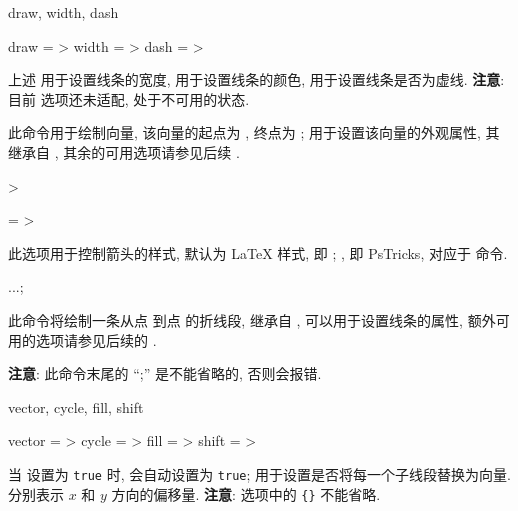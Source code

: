 \documentclass[
  hyper, lang=cn, 
  class=l3dox, 
]{../../zlatex/code/ztex}
\begin{document}
\begin{keyval}[parent=ztool/../line]{draw, width, dash}
  \begin{syntax}
    draw  = >
    width = >\dval{.4pt}
    dash  = >
  \end{syntax}
  上述  用于设置线条的宽度,  用于设置线条的颜色,  用于设置线条是否为虚线.
  \textbf{注意}: 目前  选项还未适配, 处于不可用的状态.
\end{keyval}


\begin{function}[added=2025-05-13]{\zvector}
  \begin{syntax}
     
  \end{syntax}
  此命令用于绘制向量, 该向量的起点为 , 终点为 ;
   用于设置该向量的外观属性, 其继承自 , 
  其余的可用选项请参见后续 .  
\end{function}


\begin{keyval}[parent=ztool/../vector]{>}
  \begin{syntax}
    \texttt{} = >
  \end{syntax}
  此选项用于控制箭头的样式, 默认为 \LaTeX{} 样式, 即 ; 
  , 即 PsTricks, 对应于  命令.
\end{keyval}



\begin{function}[added=2025-05-13]{\zdraw}
  \begin{syntax}
     ...;
  \end{syntax}
  此命令将绘制一条从点  到点  的折线段,  继承自 , 
  可以用于设置线条的属性, 额外可用的选项请参见后续的 .\par 
  \textbf{注意}: 此命令末尾的 ``;'' 是不能省略的, 否则会报错. 
\end{function}


\begin{keyval}[parent=ztool/../zdraw]{vector, cycle, fill, shift}
  \begin{syntax}
    vector = >
    cycle  = >
    fill   = >
    shift  = >
  \end{syntax}
  当  设置为 \texttt{true} 时,  会自动设置为 \texttt{true}; 
   用于设置是否将每一个子线段替换为向量.  分别表示 $x$ 和 $y$ 方向的偏移量. 
  \textbf{注意}:  选项中的 \texttt{\{\}} 不能省略.
\end{keyval}
\end{document}
